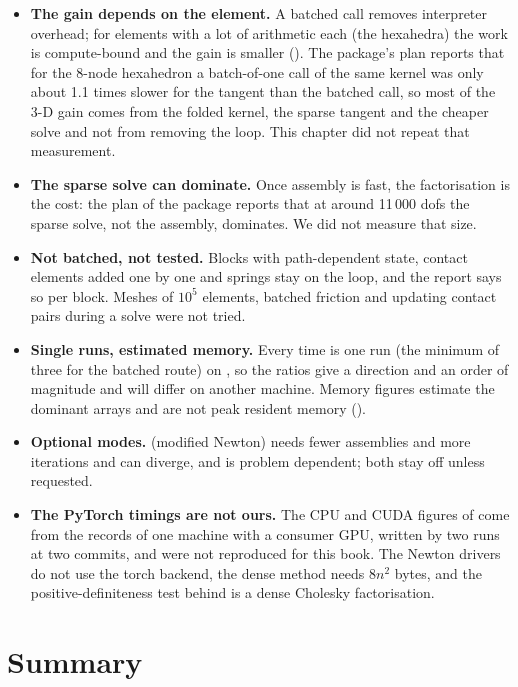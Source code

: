 \begin{limitsbox}
\begin{itemize}
\item \textbf{The gain depends on the element.} A batched call removes interpreter overhead; for elements with a lot of arithmetic each (the hexahedra) the work is compute-bound and the gain is smaller (). The package's plan reports that for the 8-node hexahedron a batch-of-one call of the same kernel was only about 1.1 times slower for the tangent than the batched call, so most of the 3-D gain comes from the folded kernel, the sparse tangent and the cheaper solve and not from removing the loop. This chapter did not repeat that measurement.
\item \textbf{The sparse solve can dominate.} Once assembly is fast, the factorisation is the cost: the plan of the package reports that at around 11\,000 dofs the sparse solve, not the assembly, dominates. We did not measure that size.
\item \textbf{Not batched, not tested.} Blocks with path-dependent state, contact elements added one by one and springs stay on the loop, and the report says so per block. Meshes of $10^5$ elements, batched friction and updating contact pairs during a solve were not tried.
\item \textbf{Single runs, estimated memory.} Every time is one run (the minimum of three for the batched route) on \machine{}, so the ratios give a direction and an order of magnitude and will differ on another machine. Memory figures estimate the dominant arrays and are not peak resident memory ().
\item \textbf{Optional modes.}  (modified Newton) needs fewer assemblies and more iterations and can diverge, and  is problem dependent; both stay off unless requested.
\item \textbf{The PyTorch timings are not ours.} The CPU and CUDA figures of  come from the records of one machine with a consumer GPU, written by two runs at two commits, and were not reproduced for this book. The Newton drivers do not use the torch backend, the dense method needs $8n^2$ bytes, and the positive-definiteness test behind  is a dense Cholesky factorisation.
\end{itemize}
\end{limitsbox}

\section{Summary}\label{sec:bk-summary}

